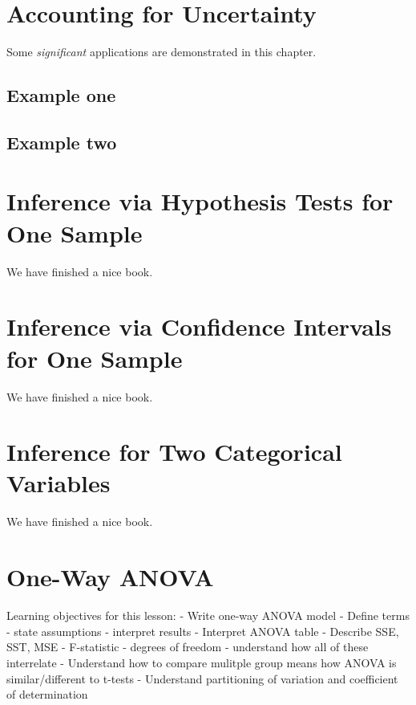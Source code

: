 \documentclass[
]{book}
\theoremstyle{definition}
\theoremstyle{definition}
\theoremstyle{definition}
\theoremstyle{remark}
\begin{document}
\hypertarget{accounting-for-uncertainty}{%
\chapter{Accounting for Uncertainty}\label{accounting-for-uncertainty}}

Some \emph{significant} applications are demonstrated in this chapter.

\hypertarget{example-one}{%
\section{Example one}\label{example-one}}

\hypertarget{example-two}{%
\section{Example two}\label{example-two}}

\hypertarget{HT}{%
\chapter{Inference via Hypothesis Tests for One Sample}\label{HT}}

We have finished a nice book.

\hypertarget{CI}{%
\chapter{Inference via Confidence Intervals for One Sample}\label{CI}}

We have finished a nice book.

\hypertarget{twocategorical}{%
\chapter{Inference for Two Categorical Variables}\label{twocategorical}}

We have finished a nice book.

\hypertarget{anova}{%
\chapter{One-Way ANOVA}\label{anova}}

Learning objectives for this lesson:
- Write one-way ANOVA model
- Define terms
- state assumptions
- interpret results
- Interpret ANOVA table
- Describe SSE, SST, MSE
- F-statistic
- degrees of freedom
- understand how all of these interrelate
- Understand how to compare mulitple group means how ANOVA is similar/different to t-tests
- Understand partitioning of variation and coefficient of determination
\end{document}
